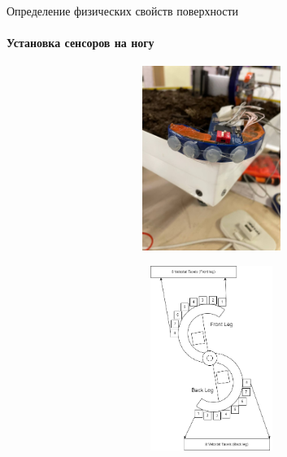 \documentclass[aspectratio=169,xcolor=table,10pt]{beamer}
\begin{document}
\begin{frame}[t]{Определение физических свойств поверхности}
    \framesubtitle{Установка сенсоров на ногу}
    \vspace{-0.7cm}
    \begin{figure}[H]
        \begin{subfigure}{0.49\textwidth}
            \centering\includegraphics[height=6cm,width=1\textwidth,keepaspectratio]{s_shape_leg/socks.jpg}
            \label{fig:s_shape_leg/socks.jpg}
        \end{subfigure}
        \begin{subfigure}{0.49\textwidth}
            \centering\includegraphics[height=6cm,width=1\textwidth,keepaspectratio]{s_shape_leg/leg_design.png}
            \label{fig:s_shape_leg/leg_design.png}
        \end{subfigure}
    \end{figure}
\end{frame}
\end{document}
